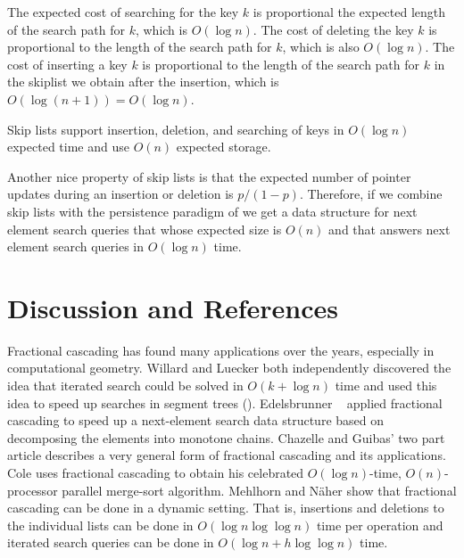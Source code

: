 The expected cost of searching for the key $k$ is proportional the
expected length of the search path for $k$, which is $O(\log n)$.
The cost of deleting the key $k$ is proportional to the length of the
search path for $k$, which is also $O(\log n)$.  The cost of inserting
a key $k$ is proportional to the length of the search path for $k$ in
the skiplist we obtain after the insertion, which is $O(\log (n+1)) =
O(\log n)$.

\begin{thm}
Skip lists support insertion, deletion, and searching of keys in
$O(\log n)$ expected time and use $O(n)$ expected storage.
\end{thm}

Another nice property of skip lists is that the expected number of
pointer updates during an insertion or deletion is $p/(1-p)$.  Therefore,
if we combine skip lists with the persistence paradigm of
 we get a data structure for next element search
queries that whose expected size is $O(n)$ and that answers next
element search queries in $O(\log n)$ time.


\section{Discussion and References}

Fractional cascading has found many applications over the years,
especially in computational geometry.  Willard \cite{w78} and Luecker
\cite{l78} both independently discovered the idea that iterated search
could be solved in $O(k+\log n)$ time and used this idea to speed up
searches in segment trees ().  Edelsbrunner
\etal\ \cite{egs86} applied fractional cascading to speed up a
next-element search data structure based on decomposing the elements
into monotone chains.  Chazelle and Guibas' two part article
\cite{cg86a,cg86b} describes a very general form of fractional
cascading and its applications.  Cole \cite{c88} uses fractional
cascading to obtain his celebrated $O(\log n)$-time, $O(n)$-processor
parallel merge-sort algorithm.  Mehlhorn and N\"aher \cite{mn90} show
that fractional cascading can be done in a dynamic setting.  That is,
insertions and deletions to the individual lists can be done in
$O(\log n\log\log n)$ time per operation and iterated search queries
can be done in $O(\log n+h\log\log n)$ time.




